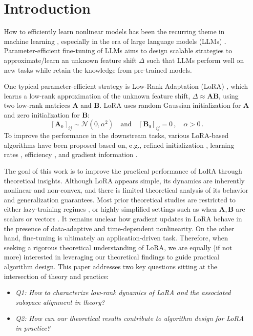 \section{Introduction}

How to efficiently learn nonlinear models has been the recurring theme in machine learning \citep{alpaydin2020introduction}, especially in the era of large language models (LLMs) \citep{brown2020language,thoppilan2022lamda}.
Parameter-efficient fine-tuning of LLMs \citep{achiam2023gpt} aims to design scalable strategies to approximate/learn an unknown feature shift $\Delta$ such that LLMs perform well on new tasks while retain the knowledge from pre-trained models.

One typical parameter-efficient strategy is Low-Rank Adaptation (LoRA) \citep{hu2022lora}, which learns a low-rank approximation of the unknown feature shift, $\Delta \approx \bm A \bm B$, using two low-rank matrices $\bm A$ and $\bm B$. LoRA uses random Gaussian initialization for $\bm A$ and zero initialization for $\bm B$:
\begin{equation}\tag{LoRA-init}\label{eq:lorainit}
    [\bm A_0]_{ij} \sim \mathcal{N}(0, \alpha^2) \quad \text{and} \quad [\bm B_0]_{ij} = 0\,, \quad \alpha > 0\,.
\end{equation}
To improve the performance in the downstream tasks, various LoRA-based algorithms have been proposed based on, e.g., refined initialization \citep{li2024crucialroleinitializationmatrix}, learning rates \citep{hayou2024lora+}, efficiency \citep{kopiczko2024vera}, and gradient information \citep{meng2024pissa,wang2024lora}.

The goal of this work is to improve the practical performance of LoRA through theoretical insights. Although LoRA appears simple, its dynamics are inherently nonlinear and non-convex, and there is limited theoretical analysis of its behavior and generalization guarantees. Most prior theoretical studies are restricted to either lazy-training regimes \citep{jang2024lora,malladi2023kernel}, or highly simplified settings such as when $\bm A, \bm B$ are scalars \citep{hayou2024lora+} or vectors \citep{dayi2024gradientdynamicslowrankfinetuning}. It remains unclear how gradient updates in LoRA behave in the presence of data-adaptive and time-dependent nonlinearity. On the other hand, fine-tuning is ultimately an application-driven task. Therefore, when seeking a rigorous theoretical understanding of LoRA, we are equally (if not more) interested in leveraging our theoretical findings to guide practical algorithm design. This paper addresses two key questions sitting at the intersection of theory and practice:
\begin{itemize}
    \item {\em Q1: How to characterize low-rank dynamics of LoRA and the associated subspace alignment in theory?}
    \item {\em Q2: How can our theoretical results contribute to algorithm design for LoRA in practice?}
\end{itemize}


